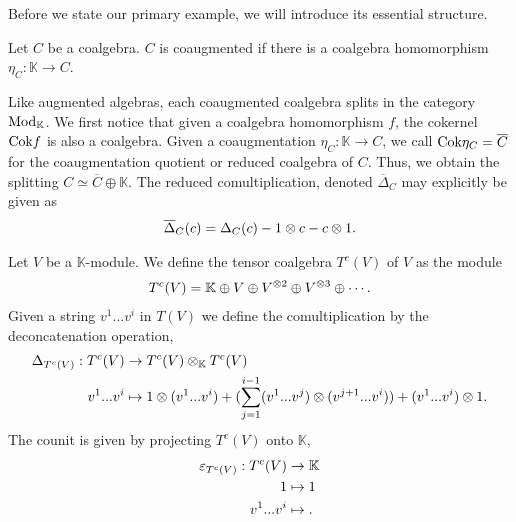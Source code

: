 \documentclass[../thesis.tex]{subfiles}
\begin{document}
            Before we state our primary example, we will introduce its essential structure.

            \begin{definition}
                Let $C$ be a coalgebra. $C$ is coaugmented if there is a coalgebra homomorphism $\eta_C:\mathbb{K}\rightarrow C$.
            \end{definition}

            Like augmented algebras, each coaugmented coalgebra splits in the category $\tt{Mod}_\mathbb{K}$. We first notice that given a coalgebra homomorphism $f$, the cokernel $\tt{Cok}f$ is also a coalgebra. Given a coaugmentation $\eta_C : \mathbb{K} \rightarrow C$, we call $\tt{Cok}\eta_C = \overline{C}$ for the coaugmentation quotient or reduced coalgebra of $C$. Thus, we obtain the splitting $C \simeq \overline{C}\oplus\mathbb{K}$. The reduced comultiplication, denoted $\overline{\Delta}_C$ may explicitly be given as
            \begin{align*}
                \overline{\Delta}_C(c) = \Delta_C(c) - 1\otimes c - c\otimes 1\tt{.}
            \end{align*}

            \begin{example}
                Let $V$ be a $\mathbb{K}$-module. We define the tensor coalgebra $T^c(V)$ of $V$ as the module
                \begin{align*}
                    T^c(V) = \mathbb{K}\oplus V\oplus V^{\otimes 2}\oplus V^{\otimes 3}\oplus \cdots\tt{.}
                \end{align*}
                Given a string $v^1...v^i$ in $T(V)$ we define the comultiplication by the deconcatenation operation,
                \begin{align*}
                    \Delta_{T^c(V)}:T^c(V) & \rightarrow T^c(V)\otimes_{\mathbb{K}}T^c(V) \\
                    v^1...v^i & \mapsto 1\otimes(v^1...v^i) + (\sum_{j=1}^{i-1} (v^1...v^{j})\otimes(v^{j+1}...v^i)) + (v^1...v^i)\otimes 1\tt{.}
                \end{align*}
                The counit is given by projecting $T^c(V)$ onto $\mathbb{K}$,
                \begin{align*}
                    \varepsilon_{T^c(V)} : T^c(V) & \rightarrow \mathbb{K} \\
                    1 & \mapsto 1 \\
                    v^1...v^i & \mapsto \tt{.}
                \end{align*}
            \end{example}
\end{document}
